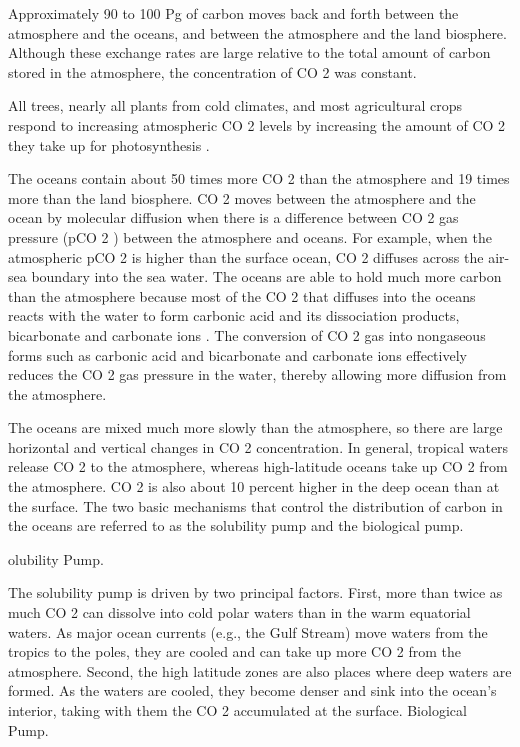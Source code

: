 \documentclass[
]{book}
\begin{document}
Approximately 90 to 100 Pg of carbon moves back and forth between the atmosphere and the oceans, and between the atmosphere and the land biosphere. Although these exchange rates are large relative to the total amount of carbon stored in the atmosphere, the concentration of CO 2 was constant.

All trees, nearly all plants from cold climates, and most agricultural crops respond to increasing atmospheric CO 2 levels by increasing the amount of CO 2 they take up for photosynthesis .

The oceans contain about 50 times more CO 2 than the atmosphere and 19 times more than the land biosphere. CO 2 moves between the atmosphere and the ocean by molecular diffusion when there is a difference between CO 2 gas pressure (pCO 2 ) between the atmosphere and oceans. For example, when the atmospheric pCO 2 is higher than the surface ocean, CO 2 diffuses across the air-sea boundary into the sea water.
The oceans are able to hold much more carbon than the atmosphere because most of the CO 2 that diffuses into the oceans reacts with the water to form carbonic acid and its dissociation products, bicarbonate and carbonate ions . The conversion of CO 2 gas into nongaseous forms such as carbonic acid and bicarbonate and carbonate ions effectively reduces the CO 2 gas pressure in the water, thereby allowing more diffusion from the atmosphere.

The oceans are mixed much more slowly than the atmosphere, so there are large horizontal and vertical changes in CO 2 concentration. In general, tropical waters release CO 2 to the atmosphere, whereas high-latitude oceans take up CO 2 from the atmosphere. CO 2 is also about 10 percent higher in the deep ocean than at the surface. The two basic mechanisms that control the distribution of carbon in the oceans are referred to as the solubility pump and the biological pump.

olubility Pump.

The solubility pump is driven by two principal factors. First, more than twice as much CO 2 can dissolve into cold polar waters than in the warm equatorial waters. As major ocean currents (e.g., the Gulf Stream) move waters from the tropics to the poles, they are cooled and can take up more CO 2 from the atmosphere. Second, the high latitude zones are also places where deep waters are formed. As the waters are cooled, they become denser and sink into the ocean's interior, taking with them the CO 2 accumulated at the surface.
Biological Pump.
\end{document}
